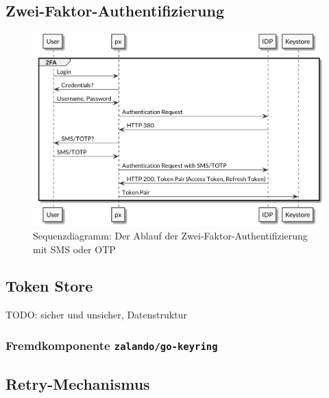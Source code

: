 \subsection{Zwei-Faktor-Authentifizierung}

\begin{figure}
    \centering
    \includegraphics[width=\linewidth]{pics/sequence-2fa.png}
    \caption{Sequenzdiagramm: Der Ablauf der Zwei-Faktor-Authentifizierung mit SMS oder OTP}
\end{figure}

\subsection{Token Store}
\label{sec:Realisierung-Token-Store}

TODO: sicher und unsicher, Datenstruktur

\subsubsection{Fremdkomponente \texttt{zalando/go-keyring}}

\subsection{Retry-Mechanismus}
\label{sec:Retry-Mechanismus}

